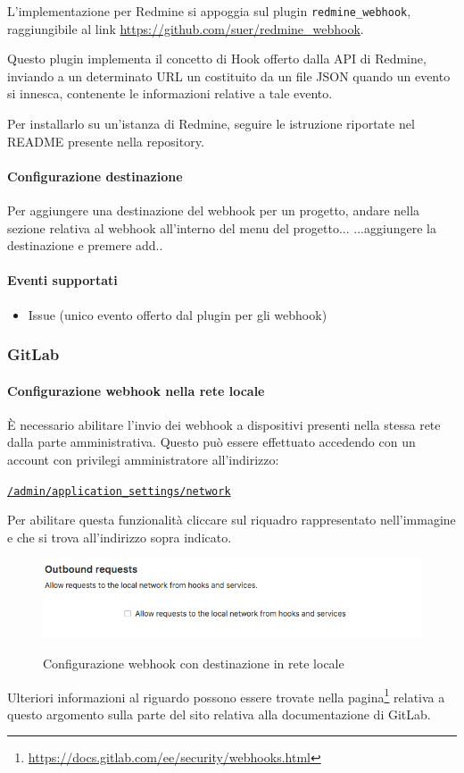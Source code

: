 	L'implementazione per Redmine si appoggia sul plugin \texttt{redmine\_webhook}, raggiungibile al link
	\url{https://github.com/suer/redmine_webhook}.

	Questo plugin implementa il concetto di Hook offerto dalla API di Redmine, inviando a un determinato URL
	un  costituito da un file JSON quando un evento si innesca, contenente le informazioni relative
	a tale evento.

	Per installarlo su un'istanza di Redmine, seguire le istruzione riportate nel README presente nella repository.

		\paragraph{Configurazione destinazione}
		Per aggiungere una destinazione del webhook per un progetto, andare nella sezione relativa al webhook all'interno del menu del progetto...
		...aggiungere la destinazione e premere add..

		\paragraph{Eventi supportati}
		\begin{itemize}
			\item Issue (unico evento offerto dal plugin per gli webhook)
		\end{itemize}


	\subsubsection{GitLab}


		\paragraph{Configurazione webhook nella rete locale}
		È necessario abilitare l'invio dei webhook a dispositivi presenti nella stessa rete dalla parte amministrativa.
		Questo può essere effettuato accedendo con un account con privilegi amministratore all'indirizzo:
		\begin{center}
			\texttt{\url{/admin/application_settings/network}}
		\end{center}
		Per abilitare questa funzionalità cliccare sul riquadro rappresentato nell'immagine e che si trova all'indirizzo sopra indicato.
		\begin{figure}[H]
			\centering
			\includegraphics[width=13cm]{img/webhook_gitlab_setup.png}\\
			\caption[Webhook, GitLab]{Configurazione webhook con destinazione in rete locale}
		\end{figure}
		Ulteriori informazioni al riguardo possono essere trovate nella pagina\footnote{\url{https://docs.gitlab.com/ee/security/webhooks.html}} relativa a questo argomento sulla parte del sito relativa alla documentazione di GitLab.



